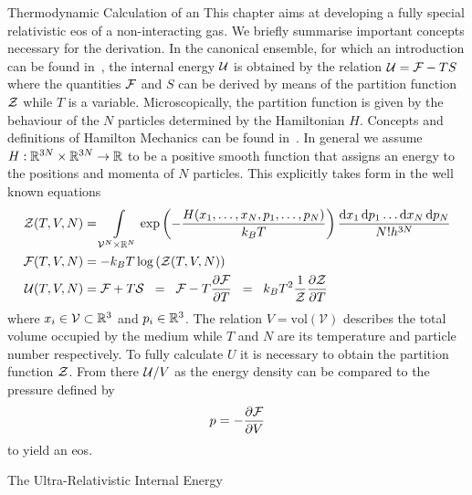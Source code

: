 \begin{section}{Thermodynamic Calculation of an \texorpdfstring{}{EoS}}
This chapter aims at developing a fully special relativistic \ac{eos} of a non-interacting gas.
We briefly summarise important concepts necessary for the derivation.
In the canonical ensemble, for which an introduction can be found in~\cite{fliessbachStatistischePhysikLehrbuch2018}, the internal energy $\mathcal{U}$ is obtained by the relation $\mathcal{U}=\mathcal{F}-TS$ where the quantities $\mathcal{F}$ and $S$ can be derived by means of the partition function $\mathcal{Z}$ while $T$ is a variable.
Microscopically, the partition function is given by the behaviour of the $N$ particles determined by the Hamiltonian $H$.
Concepts and definitions of Hamilton Mechanics can be found in~\cite{eschrigTopologyGeometryPhysics2011, fliessbachMechanikLehrbuchZur2020, spivakPhysicsMathematiciansMechanics2010}.
In general we assume $H:\mathbb{R}^{3N}\times\mathbb{R}^{3N}\rightarrow\mathbb{R}$ to be a positive smooth function that assigns an energy to the positions and momenta of $N$ particles.
This explicitly takes form in the well known equations
\begin{align}
	\mathcal{Z}(T,V,N) 	&= \int\limits_{\mathcal{V}^N\times\mathbb{R}^N}\exp\left(-\frac{H(x_1,\dots,x_N,p_1,\dots,p_N)}{k_B T}\right)\frac{\mathop{}\!\mathrm{d} x_1\mathop{}\!\mathrm{d} p_1\dots \mathop{}\!\mathrm{d} x_N\mathop{}\!\mathrm{d} p_N}{N!h^{3N}}\\
	\mathcal{F}(T,V,N) 	&= - k_B T\log\left(\mathcal{Z}(T,V,N)\right)\label{2-IntEner-FreeEnerDef}\\
	\mathcal{U}(T,V,N) 	&= \mathcal{F} + T \mathcal{S} \hspace{0.2cm}=\hspace{0.2cm} \mathcal{F} - T\frac{\partial\mathcal{F}}{\partial T} \hspace{0.2cm}=\hspace{0.2cm} k_B T^2\frac{1}{\mathcal{Z}}\frac{\partial\mathcal{Z}}{\partial T}\label{2-IntEner-Def}
\end{align}
where $x_i\in \mathcal{V}\subset\mathbb{R}^3$  and $p_i\in \mathbb{R}^3$.
The relation $V=\text{vol}(\mathcal{V})$ describes the total volume occupied by the medium while $T$ and $N$ are its temperature and particle number respectively.
To fully calculate $U$ it is necessary to obtain the partition function $\mathcal{Z}$.
From there $\mathcal{U}/V$ as the energy density can be compared to the pressure defined by
\begin{equation}
	p=-\frac{\partial\mathcal{F}}{\partial V}
	\label{eq:2-IntEner-pressureDef}
\end{equation}
to yield an \ac{eos}.
%
%
%
\begin{subsection}{The Ultra-Relativistic Internal Energy}

\end{subsection}
\end{section}
